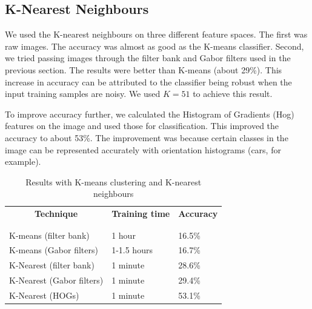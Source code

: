 \documentclass{article} %
\begin{document}
\subsection{K-Nearest Neighbours} %
We used the K-nearest neighbours on three different feature spaces. The first was raw images. The accuracy was almost as good as the K-means classifier. Second, we tried passing images through the filter bank and Gabor filters used in the previous section. The results were better than K-means (about 29\%). This increase in accuracy can be attributed to the classifier being robust when the input training samples are noisy. We used $K=51$ to achieve this result.

        To improve accuracy further, we calculated the Histogram of Gradients (Hog) \cite{dalal} features on the image and used those for classification. This improved the accuracy to about 53\%. The improvement was because certain classes in the image can be represented accurately with orientation histograms (cars, for example).

        \begin{table}[t]
            \begin{center}
                \begin{tabular}{lll}
                    \multicolumn{1}{c}{\bf Technique} &\multicolumn{1}{c}{\bf Training time} &\multicolumn{1}{c}{\bf Accuracy}\\
                    \\ \hline \\
                    K-means (filter bank) & 1 hour& 16.5\% \\
                    K-means (Gabor filters) &1-1.5 hours & 16.7\% \\
                    K-Nearest (filter bank) &1 minute& 28.6\% \\
                    K-Nearest (Gabor filters) &1 minute& 29.4\% \\
                    K-Nearest (HOGs) &1 minute& 53.1\% \\
                \end{tabular}
            \end{center}
            \caption{Results with K-means clustering and K-nearest neighbours}
            \label{tab:knn}
        \end{table}
\end{document}
